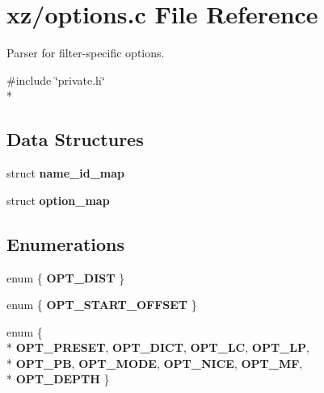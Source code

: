 \section{xz/options.c File Reference}
\label{options_8c}


Parser for filter-\/specific options.  


{\ttfamily \#include \char`\"{}private.\-h\char`\"{}}\\*
\subsection*{Data Structures}
\begin{DoxyCompactItemize}
\item 
struct {\bf name\-\_\-id\-\_\-map}
\item 
struct {\bf option\-\_\-map}
\end{DoxyCompactItemize}
\subsection*{Enumerations}
\begin{DoxyCompactItemize}
\item 
enum \{ {\bfseries O\-P\-T\-\_\-\-D\-I\-S\-T}
 \}
\item 
enum \{ {\bfseries O\-P\-T\-\_\-\-S\-T\-A\-R\-T\-\_\-\-O\-F\-F\-S\-E\-T}
 \}
\item 
enum \{ \\*
{\bfseries O\-P\-T\-\_\-\-P\-R\-E\-S\-E\-T}, 
{\bfseries O\-P\-T\-\_\-\-D\-I\-C\-T}, 
{\bfseries O\-P\-T\-\_\-\-L\-C}, 
{\bfseries O\-P\-T\-\_\-\-L\-P}, 
\\*
{\bfseries O\-P\-T\-\_\-\-P\-B}, 
{\bfseries O\-P\-T\-\_\-\-M\-O\-D\-E}, 
{\bfseries O\-P\-T\-\_\-\-N\-I\-C\-E}, 
{\bfseries O\-P\-T\-\_\-\-M\-F}, 
\\*
{\bfseries O\-P\-T\-\_\-\-D\-E\-P\-T\-H}
 \}
\end{DoxyCompactItemize}
